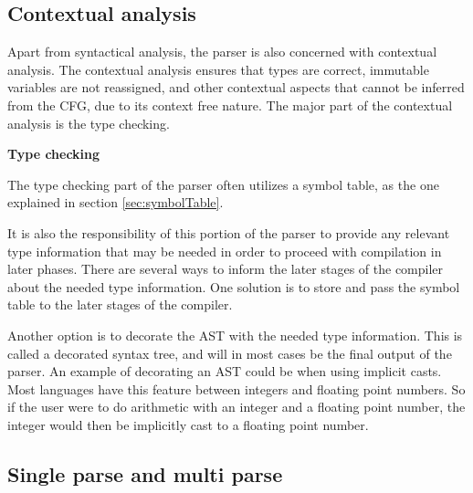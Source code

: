 %

\subsection{Contextual analysis}

Apart from syntactical analysis, the parser is also concerned with contextual analysis. 
The contextual analysis ensures that types are correct, immutable variables are not reassigned, and other contextual aspects that cannot be inferred from the CFG, due to its context free nature. 
The major part of the contextual analysis is the type checking.

\textbf{Type checking}

The type checking part of the parser often utilizes a symbol table, as the one explained in section \ref{sec:symbolTable}.

It is also the responsibility of this portion of the parser to provide any relevant type information that may be needed in order to proceed with compilation in later phases. 
There are several ways to inform the later stages of the compiler about the needed type information. 
One solution is to store and pass the symbol table to the later stages of the compiler. 

Another option is to decorate the AST with the needed type information. 
This is called a decorated syntax tree, and will in most cases be the final output of the parser.
An example of decorating an AST could be when using implicit casts. 
Most languages have this feature between integers and floating point numbers. 
So if the user were to do arithmetic with an integer and a floating point number, the integer would then be implicitly cast to a floating point number.

\subsection{Single parse and multi parse}


